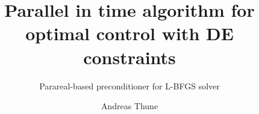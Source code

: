 \documentclass[a4paper, 12pt, titlepage, twoside, openright]{report}
\title{Parallel in time algorithm for optimal control with DE constraints}
\subtitle{Parareal-based preconditioner for L-BFGS solver }
\author{Andreas Thune}
\begin{document}
\masterfrontpage


%
\tableofcontents









%

 

%


\appendix
\end{document}
